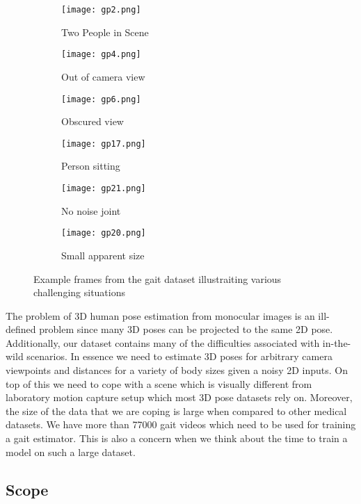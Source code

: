 \begin{figure}[htpb]
	\centering
	\begin{subfigure}[b]{0.3\linewidth}
   		\texttt{[image: gp2.png]}
    	\caption{Two People in Scene}
    \end{subfigure}
    \begin{subfigure}[b]{0.3\linewidth}
   		\texttt{[image: gp4.png]}
    	\caption{Out of camera view}
    \end{subfigure}
    \begin{subfigure}[b]{0.3\linewidth}
   		\texttt{[image: gp6.png]}
    	\caption{Obscured view}
    \end{subfigure}
    \begin{subfigure}[b]{0.3\linewidth}
   		\texttt{[image: gp17.png]}
    	\caption{Person sitting}
    \end{subfigure}
    \begin{subfigure}[b]{0.3\linewidth}
   		\texttt{[image: gp21.png]}
    	\caption{No noise joint}
    \end{subfigure}
    \begin{subfigure}[b]{0.3\linewidth}
   		\texttt{[image: gp20.png]}
    	\caption{Small apparent size}
    \end{subfigure}
    \caption{Example frames from the gait dataset illustraiting various challenging situations}
    \label{fig:gait-problems}
\end{figure}

The problem of 3D human pose estimation from monocular images is an ill-defined problem since many 3D poses can be projected to the same 2D pose. Additionally, our dataset contains many of the difficulties associated with in-the-wild scenarios. In essence we need to estimate 3D poses for arbitrary camera viewpoints and distances for a variety of body sizes given a noisy 2D inputs. On top of this we need to cope with a scene which is visually different from laboratory motion capture setup which most 3D pose datasets rely on. Moreover, the size of the data that we are coping is large when compared to other medical datasets. We have more than 77000 gait videos which need to be used for training a gait estimator. This is also a concern when we think about the time to train a model on such a large dataset.

\subsection{Scope}

